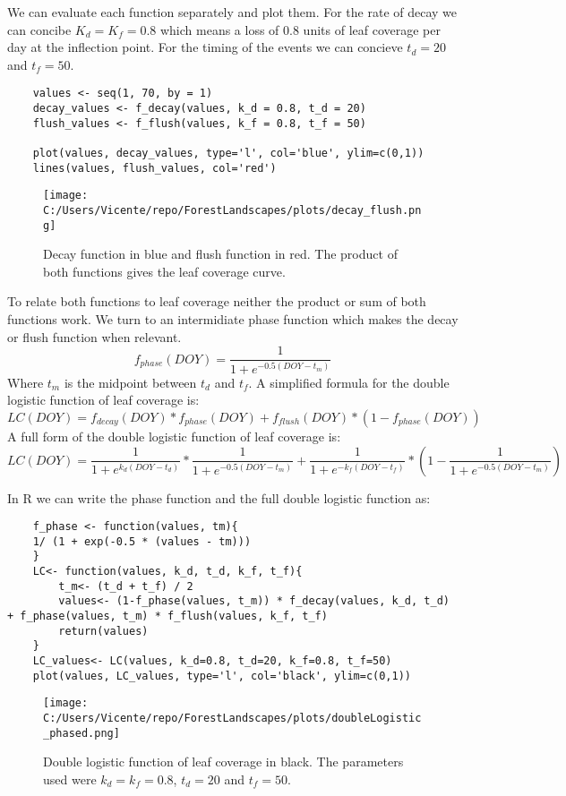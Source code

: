 \documentclass{article}
\begin{document}
We can evaluate each function separately and plot them. For the rate of decay we can concibe $K_d = K_f = 0.8$  which means a loss
of 0.8 units of leaf coverage per day at the inflection point. For the timing of the events we can concieve $t_d = 20$ and $t_f = 50$.
\begin{verbatim}
    values <- seq(1, 70, by = 1)
    decay_values <- f_decay(values, k_d = 0.8, t_d = 20)
    flush_values <- f_flush(values, k_f = 0.8, t_f = 50)

    plot(values, decay_values, type='l', col='blue', ylim=c(0,1))
    lines(values, flush_values, col='red') 
\end{verbatim}
\begin{figure}
    \centering
    \texttt{[image: C:/Users/Vicente/repo/ForestLandscapes/plots/decay\_flush.png]}
    \caption{Decay function in blue and flush function in red. The product of both functions gives the leaf coverage curve.}
    \label{fig:double_logistic_functions}
\end{figure}

To relate both functions to leaf coverage neither the product or sum of both functions work.
We turn to an intermidiate phase function which makes the decay or flush function when relevant. 
\begin{equation}
    f_{phase}(DOY)= \frac{1}{1 + e^{-0.5 (DOY - t_m)}}
\end{equation}
Where $t_m$ is the midpoint between $t_d$ and $t_f$.
A simplified formula for the double logistic function of leaf coverage is:
\begin{equation}
    LC(DOY)= f_{decay}(DOY) * f_{phase}(DOY) + f_{flush}(DOY) * (1 - f_{phase}(DOY))
\end{equation}
A full form of the double logistic function of leaf coverage is:
\begin{equation}
    LC(DOY)= \frac{1}{1 + e^{k_{d}(DOY - t_{d})}} * \frac{1}{1 + e^{-0.5 (DOY - t_m)}} + \frac{1}{1 + e^{-k_{f}(DOY - t_{f})}} * \left(1 - \frac{1}{1 + e^{-0.5 (DOY - t_m)}}\right)
\end{equation}

In R we can write the phase function and the full double logistic function as:
\begin{verbatim}
    f_phase <- function(values, tm){
    1/ (1 + exp(-0.5 * (values - tm)))   
    }
    LC<- function(values, k_d, t_d, k_f, t_f){
        t_m<- (t_d + t_f) / 2
        values<- (1-f_phase(values, t_m)) * f_decay(values, k_d, t_d) + f_phase(values, t_m) * f_flush(values, k_f, t_f)
        return(values)
    }
    LC_values<- LC(values, k_d=0.8, t_d=20, k_f=0.8, t_f=50)
    plot(values, LC_values, type='l', col='black', ylim=c(0,1))
\end{verbatim}


\begin{figure}
    \centering
    \texttt{[image: C:/Users/Vicente/repo/ForestLandscapes/plots/doubleLogistic\_phased.png]}
    \caption{Double logistic function of leaf coverage in black. The parameters used were $k_d = k_f = 0.8$, $t_d = 20$ and $t_f = 50$.}
    \label{fig:double_logistic_leaf_coverage}
\end{figure}
\end{document}
